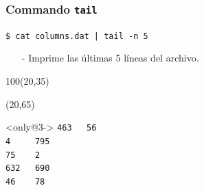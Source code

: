 \documentclass{beamer}
\begin{document}
\begin{frame}[fragile,t]
    \frametitle{Commando \texttt{tail}}
    \begin{block}{\vspace*{-3ex}}
    \texttt{\$}\verb: cat columns.dat | tail -n 5:
    \vspace*{0.5ex}
    \end{block}
    \begin{itemize}
    \item[-] Imprime las últimas 5 líneas del archivo.
    \end{itemize}
    \begin{textblock}{100}(20,35)
    \begin{center}
    \end{center}
    \end{textblock}
    \begin{textblock}{36}(20,65)
     \vspace{-0.5cm}
    \begin{block}<only@3->{\vspace*{-3ex}}
    \small
    \verb:463   56:\\
    \verb:4     795:\\
    \verb:75    2:\\
    \verb:632   690:\\
    \verb:46    78:
    \vspace*{0.5ex}
    \end{block}
    \end{textblock}
\end{frame}
\end{document}
